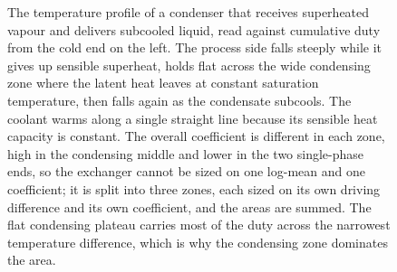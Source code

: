 \begin{figure}[htbp]
\centering
{}
\caption[Three-zone profile of a de-superheating condenser with subcooling]{The
temperature profile of a condenser that receives superheated vapour and delivers
subcooled liquid, read against cumulative duty from the cold end on the left. The
process side falls steeply while it gives up sensible superheat, holds flat across
the wide condensing zone where the latent heat leaves at constant saturation
temperature, then falls again as the condensate subcools. The coolant warms along a
single straight line because its sensible heat capacity is constant. The overall
coefficient is different in each zone, high in the condensing middle and lower in
the two single-phase ends, so the exchanger cannot be sized on one log-mean and one
coefficient; it is split into three zones, each sized on its own driving difference
and its own coefficient, and the areas are summed. The flat condensing plateau
carries most of the duty across the narrowest temperature difference, which is why
the condensing zone dominates the area.}
\label{fig:vol04ch06:condenser-zones}
\end{figure}

